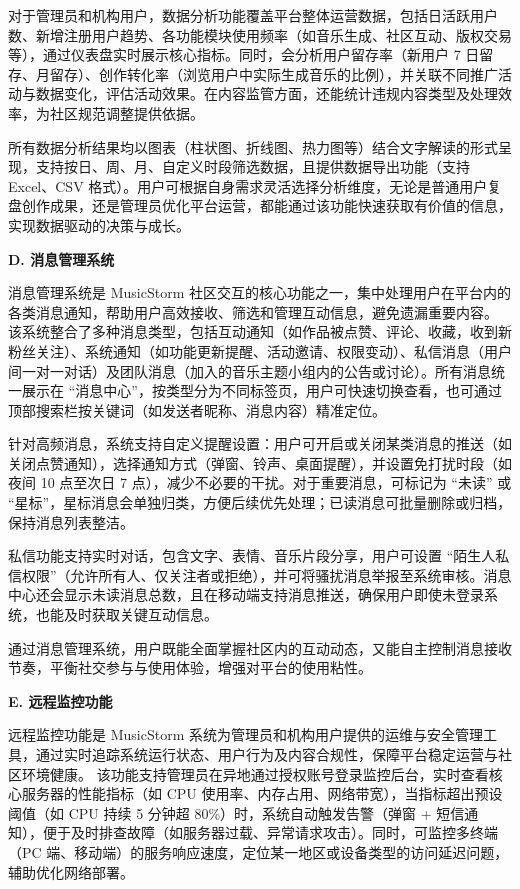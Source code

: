 \documentclass{base}
\numberwithin{figure}{section} %
\begin{document}
对于管理员和机构用户，数据分析功能覆盖平台整体运营数据，包括日活跃用户数、新增注册用户趋势、各功能模块使用频率（如音乐生成、社区互动、版权交易等），通过仪表盘实时展示核心指标。同时，会分析用户留存率（新用户 7 日留存、月留存）、创作转化率（浏览用户中实际生成音乐的比例），并关联不同推广活动与数据变化，评估活动效果。在内容监管方面，还能统计违规内容类型及处理效率，为社区规范调整提供依据。​

所有数据分析结果均以图表（柱状图、折线图、热力图等）结合文字解读的形式呈现，支持按日、周、月、自定义时段筛选数据，且提供数据导出功能（支持 Excel、CSV 格式）。用户可根据自身需求灵活选择分析维度，无论是普通用户复盘创作成果，还是管理员优化平台运营，都能通过该功能快速获取有价值的信息，实现数据驱动的决策与成长。

\textbf{D. 消息管理系统}

消息管理系统是 MusicStorm 社区交互的核心功能之一，集中处理用户在平台内的各类消息通知，帮助用户高效接收、筛选和管理互动信息，避免遗漏重要内容。
该系统整合了多种消息类型，包括互动通知（如作品被点赞、评论、收藏，收到新粉丝关注）、系统通知（如功能更新提醒、活动邀请、权限变动）、私信消息（用户间一对一对话）及团队消息（加入的音乐主题小组内的公告或讨论）。所有消息统一展示在 “消息中心”，按类型分为不同标签页，用户可快速切换查看，也可通过顶部搜索栏按关键词（如发送者昵称、消息内容）精准定位。

针对高频消息，系统支持自定义提醒设置：用户可开启或关闭某类消息的推送（如关闭点赞通知），选择通知方式（弹窗、铃声、桌面提醒），并设置免打扰时段（如夜间 10 点至次日 7 点），减少不必要的干扰。对于重要消息，可标记为 “未读” 或 “星标”，星标消息会单独归类，方便后续优先处理；已读消息可批量删除或归档，保持消息列表整洁。

私信功能支持实时对话，包含文字、表情、音乐片段分享，用户可设置 “陌生人私信权限”（允许所有人、仅关注者或拒绝），并可将骚扰消息举报至系统审核。消息中心还会显示未读消息总数，且在移动端支持消息推送，确保用户即使未登录系统，也能及时获取关键互动信息。

通过消息管理系统，用户既能全面掌握社区内的互动动态，又能自主控制消息接收节奏，平衡社交参与与使用体验，增强对平台的使用粘性。

\textbf{E. 远程监控功能}

远程监控功能是 MusicStorm 系统为管理员和机构用户提供的运维与安全管理工具，通过实时追踪系统运行状态、用户行为及内容合规性，保障平台稳定运营与社区环境健康。
该功能支持管理员在异地通过授权账号登录监控后台，实时查看核心服务器的性能指标（如 CPU 使用率、内存占用、网络带宽），当指标超出预设阈值（如 CPU 持续 5 分钟超 80\%）时，系统自动触发告警（弹窗 + 短信通知），便于及时排查故障（如服务器过载、异常请求攻击）。同时，可监控多终端（PC 端、移动端）的服务响应速度，定位某一地区或设备类型的访问延迟问题，辅助优化网络部署。​
\end{document}
